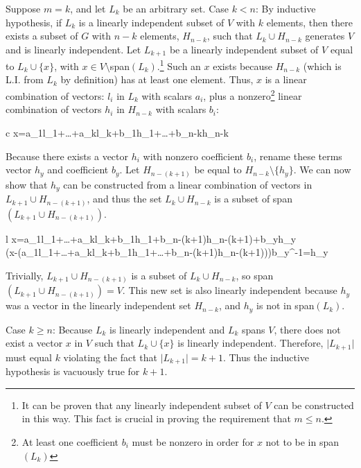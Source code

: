 \documentclass[nobib,notoc]{tufte-handout}
\begin{document}
\begin{thm}[Replacement]
\begin{IEEEproof}
	Suppose \(m=k\), and let \(L_k\) be an arbitrary set. Case \(k<n\): By inductive hypothesis, if \(L_k\) is a linearly independent subset of \(V\) with \(k\) elements, then there exists a subset of \(G\) with \(n-k\) elements, \(H_{n-k}\), such that \(L_k\cup H_{n-k}\) generates \(V\) and is linearly independent. Let \(L_{k+1}\) be a linearly independent subset of \(V\) equal to \(L_k\cup \{x\}\), with \(x\in V\setminus\)span\((L_k)\).\footnote{It can be proven that any linearly independent subset of \(V\) can be constructed in this way. This fact is crucial in proving the requirement that \(m\leq n\).} Such an \(x\) exists because \(H_{n-k}\) (which is L.I. from \(L_k\) by definition) has at least one element. Thus, \(x\) is a linear combination of vectors: \(l_i\) in \(L_k\) with scalars \(a_i\), plus a nonzero\footnote{At least one coefficient \(b_i\) must be nonzero in order for \(x\) not to be in span\((L_k)\)} linear combination of vectors \(h_i\) in \(H_{n-k}\) with scalars \(b_i\):
	\begin{IEEEeqnarray*}{c}
		x=a_1l_1+\ldots+a_kl_k+b_1h_1+\ldots+b_{n-k}h_{n-k}
	\end{IEEEeqnarray*}
	Because there exists a vector \(h_i\) with nonzero coefficient \(b_i\), rename these terms vector \(h_y\) and coefficient \(b_y\). Let \(H_{n-(k+1)}\) be equal to \(H_{n-k}\setminus \{h_y\}\). We can now show that \(h_y\) can be constructed from a linear combination of vectors in \(L_{k+1}\cup H_{n-(k+1)}\), and thus the set \(L_k\cup H_{n-k}\) is a subset of span\((L_{k+1}\cup H_{n-(k+1)})\).
	\begin{IEEEeqnarray*}{l}
		x=a_1l_1+\ldots+a_kl_k+b_1h_1+b_{n-(k+1)}h_{n-(k+1)}+b_yh_y\\
		\bigg(x-(a_1l_1+\ldots+a_kl_k+b_1h_1+\ldots+b_{n-(k+1)}h_{n-(k+1)})\bigg)\cdot b_y^{-1}=h_y
	\end{IEEEeqnarray*}
	Trivially, \(L_{k+1}\cup H_{n-(k+1)}\) is a subset of \(L_k\cup H_{n-k}\), so span\((L_{k+1}\cup H_{n-(k+1)})=V\). This new set is also linearly independent because \(h_y\) was a vector in the linearly independent set \(H_{n-k}\), and \(h_y\) is not in span\((L_k)\).

	Case \(k\geq n\): Because \(L_k\) is linearly independent and \(L_k\) spans \(V\), there does not exist a vector \(x\) in \(V\) such that \(L_k\cup\{x\}\) is linearly independent. Therefore, \(\lvert L_{k+1}\rvert\) must equal \(k\) violating the fact that \(\lvert L_{k+1}\rvert=k+1\). Thus the inductive hypothesis is vacuously true for \(k+1\).
\end{IEEEproof}
\end{thm}
\end{document}
